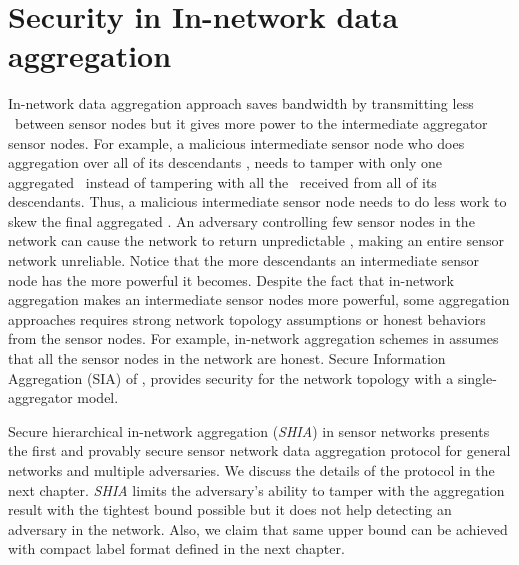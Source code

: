 \section{Security in In-network data aggregation}
	In-network data aggregation approach saves bandwidth by transmitting less \payloads\  between sensor nodes but it gives more power to the intermediate aggregator sensor nodes. 
	For example, a malicious intermediate sensor node who does aggregation over all of its descendants \payloads, needs to tamper with only one aggregated \payload\ instead of tampering with all the \payloads\ received from all of its descendants. 
	Thus, a malicious intermediate sensor node needs to do less work to skew the final aggregated \payload.
	An adversary controlling few sensor nodes in the network can cause the network to return unpredictable \payloads, making an entire sensor network unreliable.
	Notice that the more descendants an intermediate sensor node has the more powerful it becomes.
	Despite the fact that in-network aggregation makes an intermediate sensor nodes more powerful, some aggregation approaches requires strong network topology assumptions or honest behaviors from the sensor nodes.
	For example, in-network aggregation schemes in \cite{yao2002cougar, madden2003design} assumes that all the sensor nodes in the network are honest. Secure Information Aggregation (SIA) of \cite{przydatek2003sia}, provides security for the network topology with a single-aggregator model.  

	Secure hierarchical in-network aggregation (\textit{SHIA}) in sensor networks \cite{chan2006secure} presents the first and provably secure sensor network data aggregation protocol for general networks and multiple adversaries. 
	We discuss the details of the protocol in the next chapter. 
	\textit{SHIA} limits the adversary's ability to tamper with the aggregation result with the tightest bound possible but it does not help detecting an adversary in the network.
	Also, we claim that same upper bound can be achieved with compact label format defined in the next chapter.

